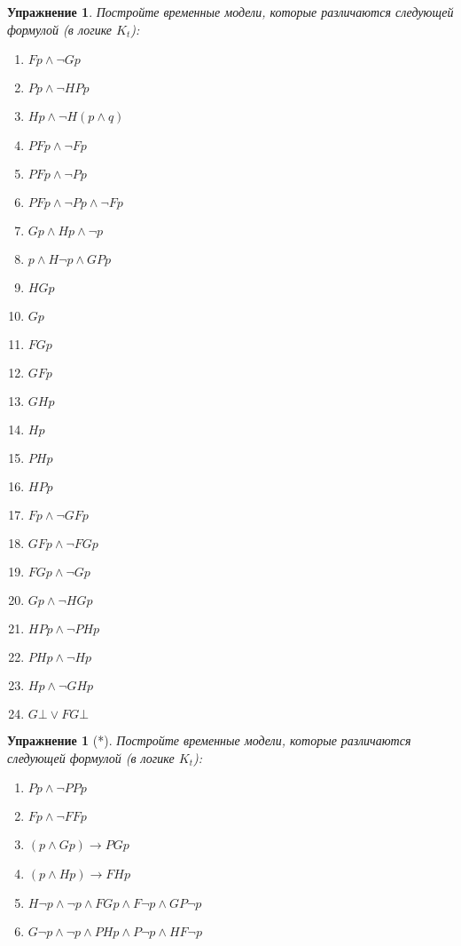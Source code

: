 \documentclass[11pt]{article}
\newtheorem{exercise}[theorem]{Упражнение}
\begin{document}
\begin{exercise} Постройте временные модели, которые различаются следующей формулой (в логике $K_t$): 
\begin{multicols}{3}
\begin{enumerate}
\item $Fp \wedge \neg Gp$
\item $Pp \wedge \neg HPp$
\item $Hp \wedge \neg H (p \wedge q)$
\item $PFp \wedge \neg Fp$
\item $PFp \wedge \neg Pp$
\item $PFp \wedge \neg Pp \wedge \neg Fp$
\item $Gp \wedge Hp \wedge \neg p$	
\item $p \wedge H \neg p \wedge GPp$
\item $HGp$
\item $Gp$
\item $FGp$
\item $GFp$
\item $GHp$
\item $Hp$
\item $PHp$
\item $HPp$
\item $Fp \wedge \neg GFp$
\item $GFp \wedge \neg FGp$
\item $FGp \wedge \neg Gp$
\item $Gp \wedge \neg HGp$
\item $HPp \wedge \neg PHp$
\item $PH p \wedge \neg Hp$
\item $Hp \wedge \neg GHp$
\item $G \bot \vee FG\bot $
\end{enumerate}
\end{multicols}
\end{exercise}


\begin{exercise}[*]Постройте временные модели, которые различаются следующей формулой (в логике $K_t$):
\begin{multicols}{2}
\begin{enumerate}
    \item $Pp \wedge \neg PPp$
    \item $Fp \wedge \neg FFp$
    \item $(p \wedge Gp) \to PGp$
    \item $(p \wedge Hp) \to FHp$
	\item $H \neg p \wedge \neg p \wedge FGp \wedge F \neg p  \wedge GP \neg p$
	\item $G\neg p \wedge \neg p \wedge PHp  \wedge P \neg p \wedge HF \neg p$
\end{enumerate}
\end{multicols}	
\end{exercise}
\end{document}
